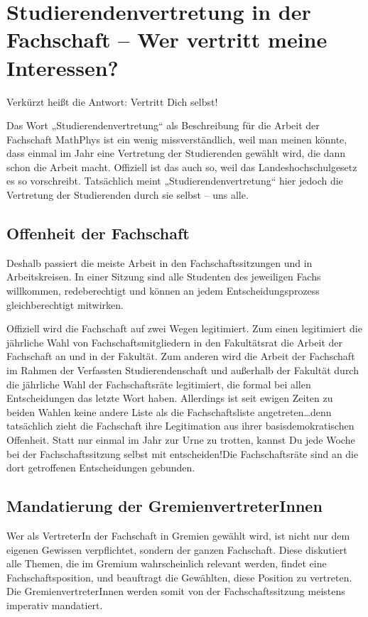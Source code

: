 \section[Studierendenvertretung in der Fachschaft]{Studierendenvertretung in der Fachschaft -- Wer vertritt meine Interessen?}

Verkürzt heißt die Antwort: Vertritt Dich selbst!

Das Wort „Studierendenvertretung“ als Beschreibung für die Arbeit der Fachschaft MathPhys ist ein wenig missverständlich, weil man meinen könnte, dass einmal im Jahr eine Vertretung der Studierenden gewählt wird, die dann schon die Arbeit macht. Offiziell ist das auch so, weil das Landeshochschulgesetz es so vorschreibt. Tatsächlich meint „Studierendenvertretung“ hier jedoch die Vertretung der Studierenden durch sie selbst -- uns alle.

\subsection*{Offenheit der Fachschaft}

Deshalb passiert die meiste Arbeit in den Fachschaftssitzungen und in Arbeitskreisen. In einer Sitzung sind alle Studenten des jeweiligen Fachs willkommen, redeberechtigt und können an jedem Entscheidungsprozess gleichberechtigt mitwirken.

Offiziell wird die Fachschaft auf zwei Wegen legitimiert. Zum einen legitimiert die jährliche Wahl von Fachschaftsmitgliedern in den Fakultätsrat die Arbeit der Fachschaft an und in der Fakultät. Zum anderen wird die Arbeit der Fachschaft im Rahmen der Verfassten Studierendenschaft und außerhalb der Fakultät durch die jährliche Wahl der Fachschaftsräte legitimiert, die formal bei allen Entscheidungen das letzte Wort haben. Allerdings ist seit ewigen Zeiten zu beiden Wahlen keine andere Liste als die Fachschaftsliste angetreten\dots denn tatsächlich zieht die Fachschaft ihre Legitimation aus ihrer basisdemokratischen Offenheit. Statt nur einmal im Jahr zur Urne zu trotten, kannst Du jede Woche bei der Fachschaftssitzung selbst mit entscheiden!Die Fachschaftsräte sind an die dort getroffenen Entscheidungen gebunden.

\subsection*{Mandatierung der GremienvertreterInnen}

Wer als VertreterIn der Fachschaft in Gremien gewählt wird, ist nicht nur dem eigenen Gewissen verpflichtet, sondern der ganzen Fachschaft. Diese diskutiert alle Themen, die im Gremium wahrscheinlich relevant werden, findet eine Fachschaftsposition, und beauftragt die Gewählten, diese Position zu vertreten. Die GremienvertreterInnen werden somit von der Fachschaftssitzung meistens imperativ mandatiert.

